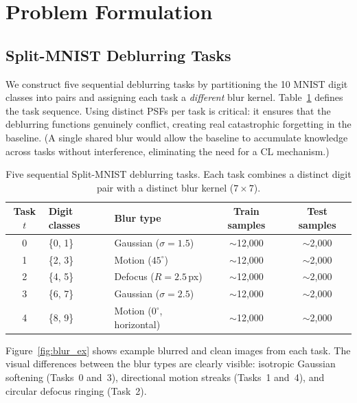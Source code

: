 \documentclass[11pt,letterpaper]{article}
\begin{document}
\section{Problem Formulation}
\label{sec:formulation}

\subsection{Split-MNIST Deblurring Tasks}

We construct five sequential deblurring tasks by partitioning the 10 MNIST
digit classes into pairs and assigning each task a \emph{different} blur
kernel.  Table~\ref{tab:tasks} defines the task sequence.  Using distinct
PSFs per task is critical: it ensures that the deblurring functions genuinely
conflict, creating real catastrophic forgetting in the baseline.  (A single
shared blur would allow the baseline to accumulate knowledge across tasks
without interference, eliminating the need for a CL mechanism.)

\begin{table}[h]
\centering
\caption{Five sequential Split-MNIST deblurring tasks.  Each task combines
         a distinct digit pair with a distinct blur kernel ($7 \times 7$).}
\label{tab:tasks}
\begin{tabular}{cllcc}
\toprule
Task $t$ & Digit classes & Blur type & Train samples & Test samples \\
\midrule
0 & \{0, 1\} & Gaussian ($\sigma{=}1.5$)       & $\sim$12{,}000 & $\sim$2{,}000 \\
1 & \{2, 3\} & Motion ($45^\circ$)              & $\sim$12{,}000 & $\sim$2{,}000 \\
2 & \{4, 5\} & Defocus ($R{=}2.5$\,px)          & $\sim$12{,}000 & $\sim$2{,}000 \\
3 & \{6, 7\} & Gaussian ($\sigma{=}2.5$)        & $\sim$12{,}000 & $\sim$2{,}000 \\
4 & \{8, 9\} & Motion ($0^\circ$, horizontal)   & $\sim$12{,}000 & $\sim$2{,}000 \\
\bottomrule
\end{tabular}
\end{table}

Figure~\ref{fig:blur_ex} shows example blurred and clean images from each
task.  The visual differences between the blur types are clearly visible:
isotropic Gaussian softening (Tasks~0 and~3), directional motion streaks
(Tasks~1 and~4), and circular defocus ringing (Task~2).
\end{document}
